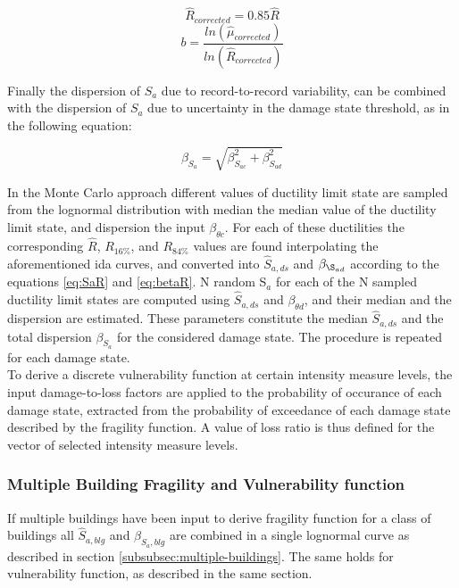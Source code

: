 {\begin{equation}
\hat{R}_{corrected}=0.85\hat{R}
\label{eq:Rcorrected}
\end{equation}
\begin{equation}
b = \frac{ln(\hat{\mu}_{corrected})}{ln(\hat{R}_{corrected})}
\label{eq:bcorrected_DF}
\end{equation}

Finally the dispersion of $S_a$ due to record-to-record variability, can be combined with the dispersion of $S_a$ due to uncertainty in the damage state threshold, as in the following equation:

\begin{equation}
\beta_{S_a} = \sqrt{\beta_{S_{a c}}^2+\beta_{S_{a d}}^2}
\label{eq:betatot_DF}
\end{equation}

In the Monte Carlo approach different values of ductility limit state are sampled from the lognormal distribution with median the median value of the ductility limit state, and dispersion the input $\beta_{\theta c}$. For each of these ductilities the corresponding $\hat{R}$, $R_{16\%}$, and $R_{84\%}$ values are found interpolating the aforementioned ida curves, and converted into $\hat{S}_{a,ds}$ and $\beta_{\S_{a d}}$ according to the equations \ref{eq:SaR} and \ref{eq:betaR}.
N random S$_a$ for each of the N sampled ductility limit states are computed using $\hat{S}_{a,ds}$ and $\beta_{\theta d}$, and their median and the dispersion are estimated. These parameters constitute the median $\hat{S}_{a,ds}$ and the total dispersion $\beta_{S_a}$ for the considered damage state. The procedure is repeated for each damage state.\\

To derive a discrete vulnerability function at certain intensity measure levels, the input damage-to-loss factors are applied to the probability of occurance of each damage state, extracted from the probability of exceedance of each damage state described by the fragility function. A value of loss ratio is thus defined for the vector of selected intensity measure levels.

\subsubsection{Multiple Building Fragility and Vulnerability function}
\label{subsubsec:multiple-building-DF}
 If multiple buildings have been input to derive fragility function for a class of buildings all $\hat{S}_{a, blg}$ and $\beta_{S_a, blg}$ are combined in a single lognormal curve as described in section \ref{subsubsec:multiple-buildings}. The same holds for vulnerability function, as described in the same section.

}
